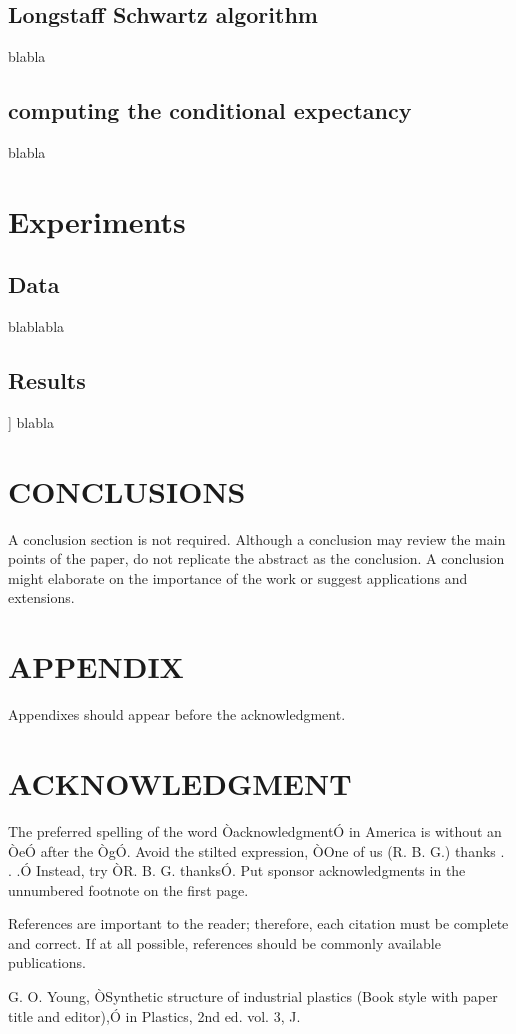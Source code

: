 \documentclass[12pt]{article}
\begin{document}
	\subsection{Longstaff Schwartz algorithm}
	blabla
	\subsection{computing the conditional expectancy}
	blabla
	
	\section{Experiments}
	
	\subsection{Data}
	
	blablabla
	
	\subsection{Results}]
	blabla
	\section{CONCLUSIONS}
	
	A conclusion section is not required. Although a conclusion may review the main points of the paper, do not replicate the abstract as the conclusion. A conclusion might elaborate on the importance of the work or suggest applications and extensions. 
	
	\addtolength{\textheight}{-12cm}  
	
	
	\section*{APPENDIX}
	
	Appendixes should appear before the acknowledgment.
	
	\section*{ACKNOWLEDGMENT}
	
	The preferred spelling of the word ÒacknowledgmentÓ in America is without an ÒeÓ after the ÒgÓ. Avoid the stilted expression, ÒOne of us (R. B. G.) thanks . . .Ó  Instead, try ÒR. B. G. thanksÓ. Put sponsor acknowledgments in the unnumbered footnote on the first page.
	
	
	
	References are important to the reader; therefore, each citation must be complete and correct. If at all possible, references should be commonly available publications.
	
	
	
	\begin{thebibliography}{99}
		
		 G. O. Young, ÒSynthetic structure of industrial plastics (Book style with paper title and editor),Ó 	in Plastics, 2nd ed. vol. 3, J.
		
	\end{thebibliography}
	
	
	
	
\end{document}
